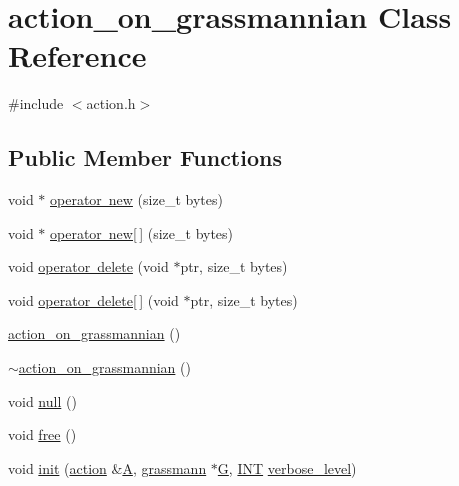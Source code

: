 \hypertarget{classaction__on__grassmannian}{}\section{action\+\_\+on\+\_\+grassmannian Class Reference}
\label{classaction__on__grassmannian}


{\ttfamily \#include $<$action.\+h$>$}

\subsection*{Public Member Functions}
\begin{DoxyCompactItemize}
\item 
void $\ast$ \mbox{\hyperlink{classaction__on__grassmannian_a0ab893c3587ad47e0b8fec1954268ceb}{operator new}} (size\+\_\+t bytes)
\item 
void $\ast$ \mbox{\hyperlink{classaction__on__grassmannian_ad222115ca994d5f5146c69ef9ad77f16}{operator new\mbox{[}$\,$\mbox{]}}} (size\+\_\+t bytes)
\item 
void \mbox{\hyperlink{classaction__on__grassmannian_a05db77cd0f2920db9c5b499063d603e7}{operator delete}} (void $\ast$ptr, size\+\_\+t bytes)
\item 
void \mbox{\hyperlink{classaction__on__grassmannian_adf45df7268192da5306469ee7dc5f724}{operator delete\mbox{[}$\,$\mbox{]}}} (void $\ast$ptr, size\+\_\+t bytes)
\item 
\mbox{\hyperlink{classaction__on__grassmannian_aa07d895e323ef89b55205708b99f7662}{action\+\_\+on\+\_\+grassmannian}} ()
\item 
\mbox{\hyperlink{classaction__on__grassmannian_a22c5f9f4092ca5d7242c4fe8e6f9bf72}{$\sim$action\+\_\+on\+\_\+grassmannian}} ()
\item 
void \mbox{\hyperlink{classaction__on__grassmannian_a421b7bc55cd0bb3708bfc8b1f3c01488}{null}} ()
\item 
void \mbox{\hyperlink{classaction__on__grassmannian_ac030dd93c8cae72c14cdf626d3e8bd21}{free}} ()
\item 
void \mbox{\hyperlink{classaction__on__grassmannian_a2cf7eda6b88fa033fdc4486fa0508e84}{init}} (\mbox{\hyperlink{classaction}{action}} \&\mbox{\hyperlink{classaction__on__grassmannian_a2a584206e8f65bb6d70b2830ac09a617}{A}}, \mbox{\hyperlink{classgrassmann}{grassmann}} $\ast$\mbox{\hyperlink{classaction__on__grassmannian_aa823614b80dec801f8582d20648418f0}{G}}, \mbox{\hyperlink{galois_8h_a09fddde158a3a20bd2dcadb609de11dc}{I\+NT}} \mbox{\hyperlink{simeon_8_c_a818073fbcc2f439e7c56952f67386122}{verbose\+\_\+level}})

\end{DoxyCompactItemize}
